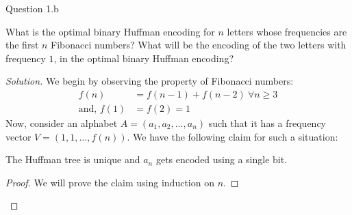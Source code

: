 \begin{solution}{Question 1.b}
    \begin{question}[]
        What is the optimal binary Huffman encoding for $n$ letters whose frequencies are the first $n$ Fibonacci numbers? What will be the encoding of the two letters with frequency $1$, in the optimal binary Huffman encoding?
    \end{question}
    \tcblower{}
    \begin{proof}[Solution]
        We begin by observing the property of Fibonacci numbers:
        \begin{equation}
            \begin{split}
                f(n)&=f(n-1)+f(n-2)\ \forall n\geq 3\\
                \text{and, } f(1)&=f(2)=1
            \end{split}
        \end{equation}
        Now, consider an alphabet $A=(a_1, a_2, \ldots,a_n)$ such that it has a frequency vector $V=(1, 1, \ldots, f(n))$. We have the following claim for such a situation:
        \begin{claim}
            The Huffman tree is unique and $a_n$ gets encoded using a single bit.
        \end{claim}
        \begin{proof}
            We will prove the claim using induction on $n$.
        \end{proof}
    \end{proof}
\end{solution}
